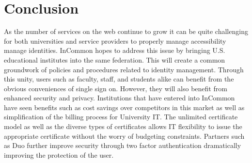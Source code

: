 \documentclass[9pt,twocolumn,twoside]{../../styles/osajnl}
\begin{document}

\section{Conclusion}

As the number of services on the web continue to grow it can be quite
challenging for both universities and service providers to properly
manage accessibility manage identities.  InCommon hopes to address
this issue by bringing U.S. educational institutes into the same
federation.  This will create a common groundwork of policies and
procedures related to identity management.  Through this unity, users
such as faculty, staff, and students alike can benefit from the
obvious conveniences of single sign on.  However, they will also benefit
from enhanced security and privacy.  Institutions that have entered
into InCommon have seen benefits such as cost savings over competitors
in this market as well as simplification of the billing process for
University IT.  The unlimited certificate model as well as the diverse
types of certificates allows IT flexibility to issue the appropriate
certificate without the worry of budgeting constraints.  Partners such
as Duo further improve security through two factor authentication
dramatically improving the protection of the user.




 
\end{document}
